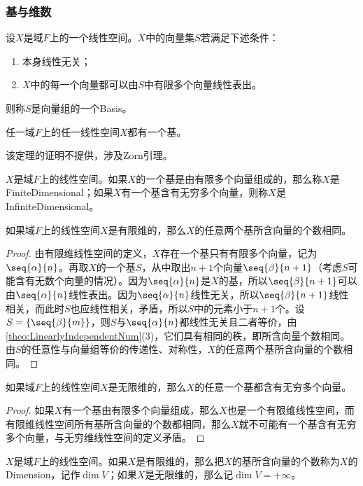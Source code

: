 \subsubsection{基与维数}
\begin{definition}
	设$X$是域$F$上的一个线性空间。$X$中的向量集$S$若满足下述条件：
	\begin{enumerate}
		\item 本身线性无关；
		\item $X$中的每一个向量都可以由$S$中有限多个向量线性表出。
	\end{enumerate}
	则称$S$是向量组的一个\gls{Basis}。
\end{definition}
\begin{theorem}\label{theo:ExistenceOfBasis}
	任一域$F$上的任一线性空间$X$都有一个基。
\end{theorem}
该定理的证明不提供，涉及Zorn引理。
\begin{definition}
	$X$是域$F$上的线性空间。如果$X$的一个基是由有限多个向量组成的，那么称$X$是\gls{FiniteDimensional}；如果$X$有一个基含有无穷多个向量，则称$X$是\gls{InfiniteDimensional}。
\end{definition}
\begin{theorem}
	如果域$F$上的线性空间$X$是有限维的，那么$X$的任意两个基所含向量的个数相同。
\end{theorem}
\begin{proof}
	由有限维线性空间的定义，$X$存在一个基只有有限多个向量，记为$\seq{\alpha}{n}$。再取$X$的一个基$S$，从中取出$n+1$个向量$\seq{\beta}{n+1}$（考虑$S$可能含有无数个向量的情况）。因为$\seq{\alpha}{n}$是$X$的基，所以$\seq{\beta}{n+1}$可以由$\seq{\alpha}{n}$线性表出。因为$\seq{\alpha}{n}$线性无关，所以$\seq{\beta}{n+1}$线性相关，而此时$S$也应线性相关，矛盾，所以$S$中的元素小于$n+1$个。设$S=\{\seq{\beta}{m}\}$，则$S$与$\seq{\alpha}{n}$都线性无关且二者等价，由\cref{theo:LinearlyIndependentNum}(3)，它们具有相同的秩，即所含向量个数相同。由$S$的任意性与向量组等价的传递性、对称性，$X$的任意两个基所含向量的个数相同。
\end{proof}
\begin{corollary}
	如果域$F$上的线性空间$X$是无限维的，那么$X$的任意一个基都含有无穷多个向量。
\end{corollary}
\begin{proof}
	如果$X$有一个基由有限多个向量组成，那么$X$也是一个有限维线性空间，而有限维线性空间所有基所含向量的个数都相同，那么$X$就不可能有一个基含有无穷多个向量，与无穷维线性空间的定义矛盾。
\end{proof}
\begin{definition}
	$X$是域$F$上的线性空间。如果$X$是有限维的，那么把$X$的基所含向量的个数称为$X$的\gls{Dimension}，记作$\operatorname{dim}V$；如果$X$是无限维的，那么记$\dim V=+\infty$。
\end{definition}
